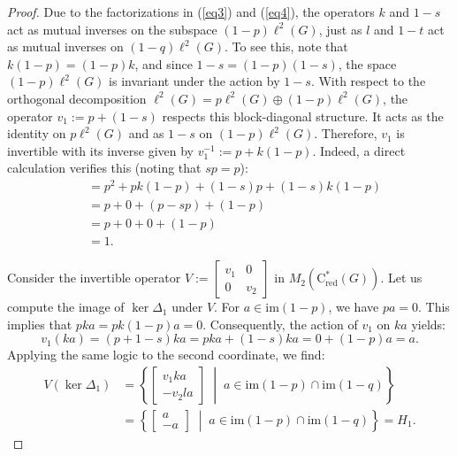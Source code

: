 \documentclass[a4paper,leqno,12pt]{article}
\numberwithin{equation}{section}
\theoremstyle{plain}
\theoremstyle{definition}
\theoremstyle{remark}
\newcommand{\Csr}{\mathrm{C}^*_{\text{red}}}
\begin{document}
\begin{proof}
Due to the factorizations in (\ref{eq3}) and (\ref{eq4}), the operators $k$ and $1-s$ act as mutual inverses on the subspace $(1-p) \ell^2(G)$, just as $l$ and $1-t$ act as mutual inverses on $(1-q) \ell^2(G)$. To see this, note that $k(1-p)=(1-p)k$, and since $1-s=(1-p)(1-s)$, the space $(1-p)\ell^2(G)$ is invariant under the action by $1-s$. With respect to the orthogonal decomposition $\ell^2(G)=p \ell^2(G) \oplus(1-p) \ell^2(G)$, the operator $v_1:=p+(1-s)$ respects this block-diagonal structure. It acts as the identity on $p \ell^2(G)$ and as $1-s$ on $(1-p) \ell^2(G)$. Therefore, $v_1$ is invertible with its inverse given by $v_1^{-1}:= p + k(1-p)$. 
Indeed, a direct calculation verifies this (noting that $sp = p$):
\begin{align*}
[p+(1-s)][p+k(1-p)] &= p^2 + pk(1-p) + (1-s)p + (1-s)k(1-p) \\
&= p + 0 + (p-sp) + (1-p) \\
&= p + 0 + 0 + (1-p) \\
&= 1.
\end{align*}


Consider the invertible operator $V:=\begin{bmatrix} v_1 & 0 \\ 0 & v_2 \end{bmatrix}$ in $M_2(\Csr(G))$. Let us compute the image of $\ker \Delta_1$ under $V$. For $a \in \mathrm{im}(1-p)$, we have $pa = 0$. This implies that $pka = pk(1-p)a = 0$. Consequently, the action of $v_1$ on $ka$ yields:
\[
v_1(ka) = (p+1-s)ka = pka + (1-s)ka = 0 + (1-p)a = a.
\]
Applying the same logic to the second coordinate, we find:
\begin{align*}
V(\ker \Delta_1) &= \left\{ \begin{bmatrix} v_1 ka \\ -v_2 la \end{bmatrix} \;\middle|\; a \in \mathrm{im}(1-p) \cap \mathrm{im}(1-q) \right\} \\
&= \left\{ \begin{bmatrix} a \\ -a \end{bmatrix} \;\middle|\; a \in \mathrm{im}(1-p) \cap \mathrm{im}(1-q) \right\} = H_1.
\end{align*}


\end{proof}
\end{document}
